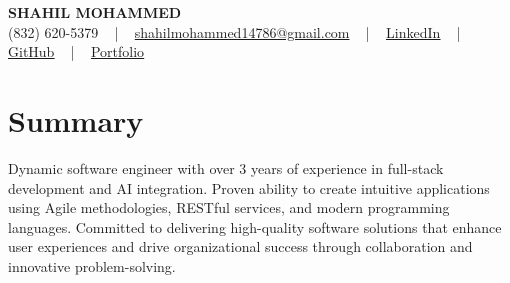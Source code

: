 \documentclass[letterpaper,10pt]{article}
\begin{document}
\begin{center}
    {\fontsize{14pt}{12pt}\selectfont \textbf{\MakeUppercase{Shahil Mohammed}}}\\ \vspace{2pt}
    \fontsize{10pt}{12pt}\selectfont (832) 620-5379 ~ | ~ \href{mailto:shahilmohammed14786@gmail.com}{shahilmohammed14786@gmail.com} ~ | ~  
    \href{https://www.linkedin.com/in/shahil-mohammed-9652931a1/}{\color{blue}\underline{LinkedIn}}  ~ | ~ 
    \href{https://github.com/freakbeast14}{\color{blue}\underline{GitHub}} ~ | ~ 
    \href{https://shahil-mohammed.netlify.app/}{\color{blue}\underline{Portfolio}}
    \vspace{-8pt}
\end{center}

\section{Summary}
\vspace{-2pt}\fontsize{8pt}{9pt}\selectfont
Dynamic software engineer with over 3 years of experience in full-stack development and AI integration. Proven ability to create intuitive applications using Agile methodologies, RESTful services, and modern programming languages. Committed to delivering high-quality software solutions that enhance user experiences and drive organizational success through collaboration and innovative problem-solving.
 \vspace{-5pt}
 
\vspace{-2pt}
\end{document}
